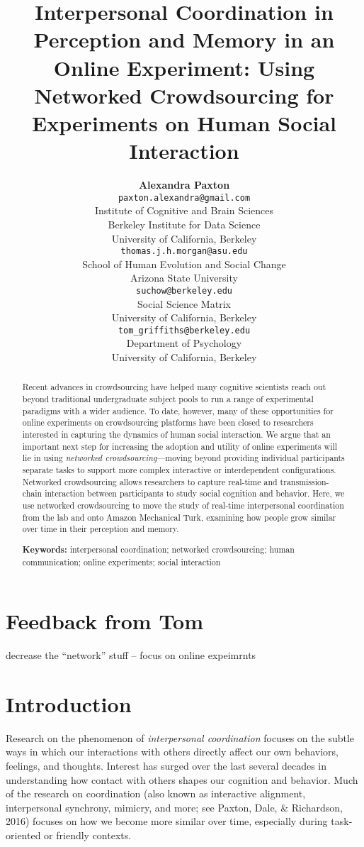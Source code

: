 \documentclass[10pt, letterpaper]{article}
\title{Interpersonal Coordination in Perception and Memory in an Online
Experiment: Using Networked Crowdsourcing for Experiments on Human
Social Interaction}
\author{{\large \bf Alexandra Paxton} \\ \texttt{paxton.alexandra@gmail.com} \\ Institute of Cognitive and Brain Sciences \\ Berkeley Institute for Data Science \\ University of California, Berkeley \And {\large \bf Thomas J. H. Morgan} \\ \texttt{thomas.j.h.morgan@asu.edu} \\ School of Human Evolution and Social Change \\ Arizona State University \AND {\large \bf Jordan W. Suchow} \\ \texttt{suchow@berkeley.edu} \\ Social Science Matrix \\ University of California, Berkeley \And {\large \bf Thomas L. Griffiths} \\ \texttt{tom\_griffiths@berkeley.edu} \\ Department of Psychology \\ University of California, Berkeley}
\begin{document}
\maketitle

\begin{abstract}
Recent advances in crowdsourcing have helped many cognitive scientists
reach out beyond traditional undergraduate subject pools to run a range
of experimental paradigms with a wider audience. To date, however, many
of these opportunities for online experiments on crowdsourcing platforms
have been closed to researchers interested in capturing the dynamics of
human social interaction. We argue that an important next step for
increasing the adoption and utility of online experiments will lie in
using \emph{networked crowdsourcing}---moving beyond providing
individual participants separate tasks to support more complex
interactive or interdependent configurations. Networked crowdsourcing
allows researchers to capture real-time and transmission-chain
interaction between participants to study social cognition and behavior.
Here, we use networked crowdsourcing to move the study of real-time
interpersonal coordination from the lab and onto Amazon Mechanical Turk,
examining how people grow similar over time in their perception and
memory.

\textbf{Keywords:}
interpersonal coordination; networked crowdsourcing; human
communication; online experiments; social interaction
\end{abstract}

\section{Feedback from Tom}\label{feedback-from-tom}

decrease the ``network'' stuff -- focus on online expeimrnts

\section{Introduction}\label{introduction}

Research on the phenomenon of \emph{interpersonal coordination} focuses
on the subtle ways in which our interactions with others directly affect
our own behaviors, feelings, and thoughts. Interest has surged over the
last several decades in understanding how contact with others shapes our
cognition and behavior. Much of the research on coordination (also known
as interactive alignment, interpersonal synchrony, mimicry, and more;
see Paxton, Dale, \& Richardson, 2016) focuses on how we become more
similar over time, especially during task-oriented or friendly contexts.
\end{document}
